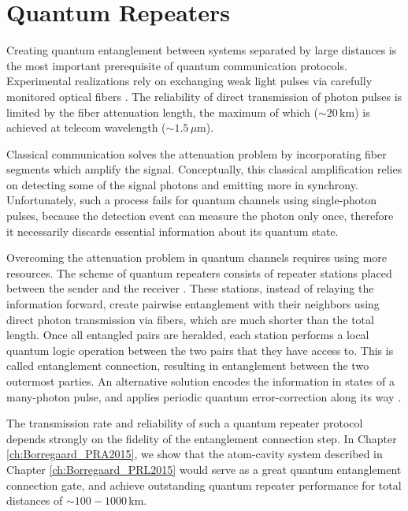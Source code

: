 \section{Quantum Repeaters}
Creating quantum entanglement between systems separated by
large distances is the most important prerequisite of quantum communication
protocols. Experimental realizations rely on exchanging weak light pulses
via carefully monitored optical fibers \cite{Peev2009}. The
reliability of direct transmission of photon pulses is limited by the
fiber attenuation length, the maximum of which ($\sim 20\,\mathrm{km}$) is
achieved at telecom wavelength ($\sim 1.5\,\mu\mathrm{m}$).

Classical communication solves the attenuation problem by incorporating fiber
segments which amplify the signal. Conceptually, this classical amplification
relies on detecting some of the signal photons and emitting more in synchrony.
Unfortunately, such a process fails for quantum channels using single-photon
pulses, because the detection event can measure the photon only once,
therefore it necessarily discards essential information about its quantum state.

Overcoming the attenuation problem in quantum channels requires using more
resources. The scheme of quantum repeaters consists of repeater stations placed
between the sender and the receiver \cite{bennett2, bennett, duan3}.
These stations, instead of relaying the information forward, create pairwise
entanglement with their neighbors using direct photon transmission via 
fibers, which are much shorter than the total length. Once all entangled pairs
are heralded, each station performs a local quantum logic operation between the
two pairs that they have access to. This is called entanglement connection,
resulting in entanglement between the two outermost parties. An alternative solution 
encodes the information in states of a many-photon pulse, and applies periodic
quantum error-correction along its way \cite{Muralidharan2015}.

The transmission rate  and reliability of such a quantum repeater protocol
depends strongly on the fidelity of the entanglement connection step. In Chapter
\ref{ch:Borregaard_PRA2015}, we show that the atom-cavity system described
in Chapter \ref{ch:Borregaard_PRL2015} would serve as a great quantum
entanglement connection gate, and achieve outstanding quantum repeater
performance for total distances of $\sim 100-1000\,\mathrm{km}$.



